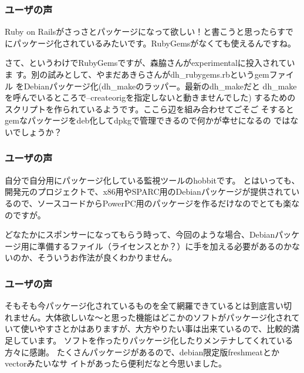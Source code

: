 \documentclass[cjk,dvipdfmx]{beamer}
\begin{document}
\begin{frame}
 \frametitle{ユーザの声}

Ruby on Railsがさっさとパッケージになって欲しい！と書こうと思ったらすでにパッケージ化されているみたいです。RubyGemsがなくても使えるんですね。

さて、というわけでRubyGemsですが、森脇さんがexperimentalに投入されていま
す。別の試みとして、やまだあきらさんがdh\_{}rubygems.rbというgemファイル
をDebianパッケージ化(dh\_{}makeのラッパー。最新のdh\_{}makeだと
dh\_{}makeを呼んでいるところで--createorigを指定しないと動きませんでした)
するためのスクリプトを作られているようです。ここら辺を組み合わせてごそご
そするとgemなパッケージをdeb化してdpkgで管理できるので何かが幸せになるの
ではないでしょうか？
\end{frame}
\begin{frame}
 \frametitle{ユーザの声}

自分で自分用にパッケージ化している監視ツールのhobbitです。
とはいっても、開発元のプロジェクトで、x86用やSPARC用のDebianパッケージが提供されているので、ソースコードからPowerPC用のパッケージを作るだけなのでとても楽なのですが。

どなたかにスポンサーになってもらう時って、今回のような場合、Debianパッケージ用に準備するファイル（ライセンスとか？）に手を加える必要があるのかないのか、そういうお作法が良くわかりません。
\end{frame}
\begin{frame}
 \frametitle{ユーザの声}

そもそも今パッケージ化されているものを全て網羅できているとは到底言い切
れません。大体欲しいな〜と思った機能はどこかのソフトがパッケージ化されて
いて使いやすさとかはありますが、大方やりたい事は出来ているので、比較的満
足しています。
ソフトを作ったりパッケージ化したりメンテナしてくれている方々に感謝。
たくさんパッケージがあるので、debian限定版freshmeatとかvectorみたいなサ
イトがあったら便利だなと今思いました。
\end{frame}
\end{document}
